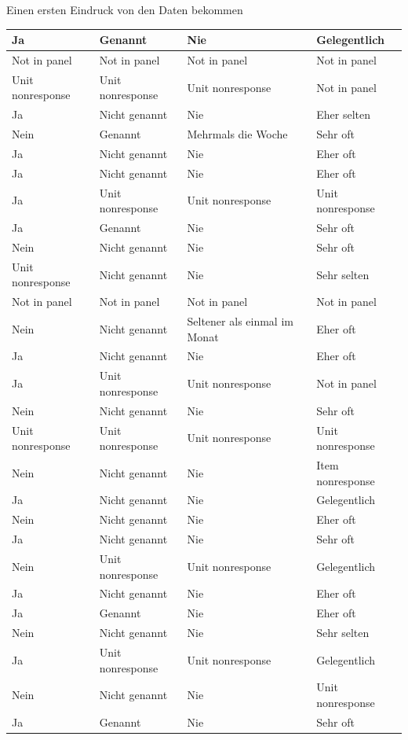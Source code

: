 \documentclass[ignorenonframetext,]{beamer}
\begin{document}
\begin{frame}{Einen ersten Eindruck von den Daten bekommen}
\begin{tabular}{l|l|l|l}
\hline
Ja & Genannt & Nie & Gelegentlich\\
\hline
Not in panel & Not in panel & Not in panel & Not in panel\\
\hline
Unit nonresponse & Unit nonresponse & Unit nonresponse & Not in panel\\
\hline
Ja & Nicht genannt & Nie & Eher selten\\
\hline
Nein & Genannt & Mehrmals die Woche & Sehr oft\\
\hline
Ja & Nicht genannt & Nie & Eher oft\\
\hline
Ja & Nicht genannt & Nie & Eher oft\\
\hline
Ja & Unit nonresponse & Unit nonresponse & Unit nonresponse\\
\hline
Ja & Genannt & Nie & Sehr oft\\
\hline
Nein & Nicht genannt & Nie & Sehr oft\\
\hline
Unit nonresponse & Nicht genannt & Nie & Sehr selten\\
\hline
Not in panel & Not in panel & Not in panel & Not in panel\\
\hline
Nein & Nicht genannt & Seltener als einmal im Monat & Eher oft\\
\hline
Ja & Nicht genannt & Nie & Eher oft\\
\hline
Ja & Unit nonresponse & Unit nonresponse & Not in panel\\
\hline
Nein & Nicht genannt & Nie & Sehr oft\\
\hline
Unit nonresponse & Unit nonresponse & Unit nonresponse & Unit nonresponse\\
\hline
Nein & Nicht genannt & Nie & Item nonresponse\\
\hline
Ja & Nicht genannt & Nie & Gelegentlich\\
\hline
Nein & Nicht genannt & Nie & Eher oft\\
\hline
Ja & Nicht genannt & Nie & Sehr oft\\
\hline
Nein & Unit nonresponse & Unit nonresponse & Gelegentlich\\
\hline
Ja & Nicht genannt & Nie & Eher oft\\
\hline
Ja & Genannt & Nie & Eher oft\\
\hline
Nein & Nicht genannt & Nie & Sehr selten\\
\hline
Ja & Unit nonresponse & Unit nonresponse & Gelegentlich\\
\hline
Nein & Nicht genannt & Nie & Unit nonresponse\\
\hline
Ja & Genannt & Nie & Sehr oft\\

\end{tabular}
\end{frame}
\end{document}
